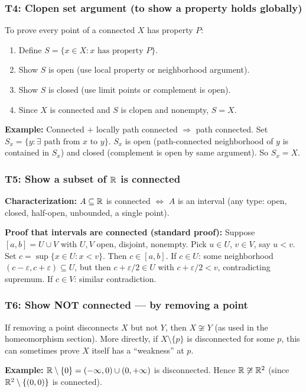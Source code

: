 \documentclass{article}
\begin{document}
\subsubsection*{T4: Clopen set argument (to show a property holds globally)}
To prove every point of a connected $X$ has property $P$:
\begin{enumerate}
  \item Define $S = \{x \in X : x \text{ has property } P\}$.
  \item Show $S$ is open (use local property or neighborhood argument).
  \item Show $S$ is closed (use limit points or complement is open).
  \item Since $X$ is connected and $S$ is clopen and nonempty, $S = X$.
\end{enumerate}

\textbf{Example:} Connected $+$ locally path connected $\Rightarrow$ path
connected. Set $S_x = \{y : \exists\text{ path from } x \text{ to } y\}$.
$S_x$ is open (path-connected neighborhood of $y$ is contained in $S_x$)
and closed (complement is open by same argument). So $S_x = X$.

\subsubsection*{T5: Show a subset of $\mathbb{R}$ is connected}
\textbf{Characterization:} $A \subseteq \mathbb{R}$ is connected $\iff$ $A$ is an
interval (any type: open, closed, half-open, unbounded, a single point).

\textbf{Proof that intervals are connected (standard proof):}
Suppose $[a,b] = U \cup V$ with $U, V$ open, disjoint, nonempty.
Pick $u \in U$, $v \in V$, say $u < v$. Set $c = \sup\{x \in U : x < v\}$.
Then $c \in [a,b]$. If $c \in U$: some neighborhood $(c - \varepsilon,
c + \varepsilon) \subseteq U$, but then $c + \varepsilon/2 \in U$ with
$c + \varepsilon/2 < v$, contradicting supremum. If $c \in V$: similar
contradiction.

\subsubsection*{T6: Show NOT connected --- by removing a point}
If removing a point disconnects $X$ but not $Y$, then $X \not\cong Y$
(as used in the homeomorphism section). More directly, if $X \setminus
\{p\}$ is disconnected for some $p$, this can sometimes prove $X$ itself
has a ``weakness'' at $p$.

\textbf{Example:} $\mathbb{R} \setminus \{0\} = (-\infty, 0) \cup (0, +\infty)$
is disconnected. Hence $\mathbb{R} \not\cong \mathbb{R}^2$ (since $\mathbb{R}^2 \setminus
\{(0,0)\}$ is connected).
\end{document}
